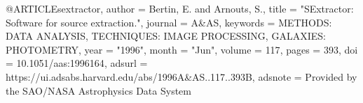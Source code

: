 
@ARTICLE{sextractor,
       author = {{Bertin}, E. and {Arnouts}, S.},
        title = "{SExtractor: Software for source extraction.}",
      journal = {A\&AS},
     keywords = {METHODS: DATA ANALYSIS, TECHNIQUES: IMAGE PROCESSING, GALAXIES: PHOTOMETRY},
         year = "1996",
        month = "Jun",
       volume = {117},
        pages = {393},
          doi = {10.1051/aas:1996164},
       adsurl = {https://ui.adsabs.harvard.edu/abs/1996A&AS..117..393B},
      adsnote = {Provided by the SAO/NASA Astrophysics Data System}
}
